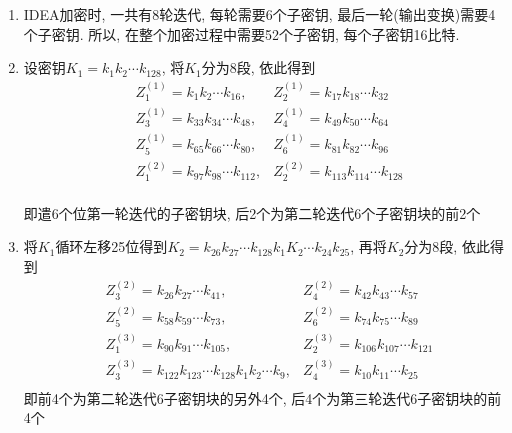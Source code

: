 \documentclass[UTF8]{ctexart}
\begin{document}
    \begin{enumerate}
        \item IDEA加密时, 一共有8轮迭代, 每轮需要6个子密钥, 最后一轮(输出变换)需要4个子密钥. 所以, 在整个加密过程中需要52个子密钥, 每个子密钥16比特.
        \item 设密钥$K_1=k_1k_2\cdots k_{128}$, 将$K_1$分为8段, 依此得到
        $$
        \begin{aligned}
            &Z_1^{(1)}=k_1k_2\cdots k_{16}, &Z_2^{(1)}=k_{17}k_{18}\cdots k_{32}\\
            &Z_3^{(1)}=k_33k_34\cdots k_{48}, &Z_4^{(1)}=k_{49}k_{50}\cdots k_{64}\\
            &Z_5^{(1)}=k_65k_66\cdots k_{80}, &Z_6^{(1)}=k_{81}k_{82}\cdots k_{96}\\
            &Z_1^{(2)}=k_{97}k_{98}\cdots k_{112}, &Z_2^{(2)}=k_{113}k_{114}\cdots k_{128}\\
        \end{aligned}
        $$

        即遣6个位第一轮迭代的子密钥块, 后2个为第二轮迭代6个子密钥块的前2个

        \item 将$K_1$循环左移25位得到$K_2=k_{26}k_{27}\cdots k_{128}k_1K_2\cdots k_{24}k_{25}$, 再将$K_2$分为8段, 依此得到
        $$
        \begin{aligned}
            &Z_3^{(2)}=k_{26}k_{27}\cdots k_{41}, &Z_4^{(2)}=k_{42}k_{43}\cdots k_{57}\\
            &Z_5^{(2)}=k_{58}k_{59}\cdots k_{73}, &Z_6^{(2)}=k_{74}k_{75}\cdots k_{89}\\
            &Z_1^{(3)}=k_{90}k_{91}\cdots k_{105}, &Z_2^{(3)}=k_{106}k_{107}\cdots k_{121}\\
            &Z_3^{(3)}=k_{122}k_{123}\cdots k_{128}k_{1}k_{2}\cdots k_{9}, &Z_4^{(3)}=k_{10}k_{11}\cdots k_{25}\\
        \end{aligned}
        $$
        即前4个为第二轮迭代6子密钥块的另外4个, 后4个为第三轮迭代6子密钥块的前4个


\end{enumerate}
\end{document}
